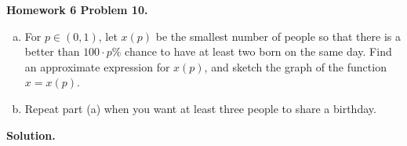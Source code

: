 
\textbf{Homework 6 Problem 10.}

\begin{enumerate}[(a)]

\item For \(p \in (0, 1)\), let \(x(p)\) be the smallest number of people so that there is a better than \(100 \cdot p \%\) chance to have at least two born on the same day. Find an approximate expression for \(x(p)\), and sketch the graph of the function \(x = x(p)\).

\item Repeat part (a) when you want at least three people to share a birthday.

\end{enumerate}

\textbf{Solution.} 

